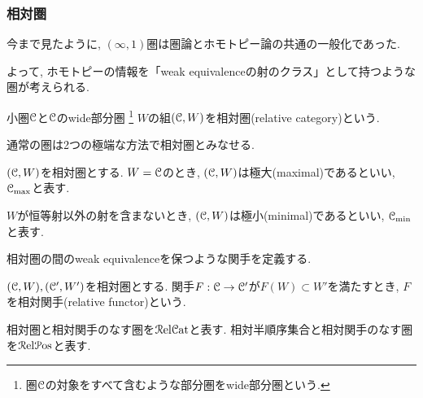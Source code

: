 \documentclass[aspectratio=169, dvipdfmx, 8pt, notheorems, uplatex]{beamer}
\begin{document}
\begin{frame}
  \frametitle{相対圏}

  今まで見たように, $(\infty,1)$圏は圏論とホモトピー論の共通の一般化であった. 
  
  よって, ホモトピーの情報を「weak equivalenceの射のクラス」として持つような圏が考えられる. 

  \begin{definition}[相対圏]
    小圏$\mathcal{C}$と$\mathcal{C}$のwide部分圏
    \footnote{
      圏$\mathcal{C}$の対象をすべて含むような部分圏をwide部分圏という. 
    }
    $W$の組$(\mathcal{C},W)$を相対圏(relative category)という. 
    
  \end{definition}

  通常の圏は2つの極端な方法で相対圏とみなせる. 

  \begin{example}[極大と極小]
    $(\mathcal{C},W)$を相対圏とする. 
    $W=\mathcal{C}$のとき, $(\mathcal{C},W)$は極大(maximal)であるといい, $\mathcal{C}_{\mathrm{max}}$と表す. 

    $W$が恒等射以外の射を含まないとき, $(\mathcal{C},W)$は極小(minimal)であるといい, $\mathcal{C}_{\mathrm{min}}$と表す.
  \end{example}

  相対圏の間のweak equivalenceを保つような関手を定義する. 

  \begin{definition}[相対関手]
    $(\mathcal{C},W), (\mathcal{C}',W')$を相対圏とする. 
    関手$F : \mathcal{C} \to \mathcal{C}'$が$F(W) \subset W'$を満たすとき, $F$を相対関手(relative functor)という. 
  \end{definition}

  相対圏と相対関手のなす圏を$\mathcal{R}\mathrm{el}\mathcal{C}\mathrm{at}$と表す. 
  相対半順序集合と相対関手のなす圏を$\mathcal{R}\mathrm{el}\mathcal{P}\mathrm{os}$と表す. 

\end{frame}
\end{document}
